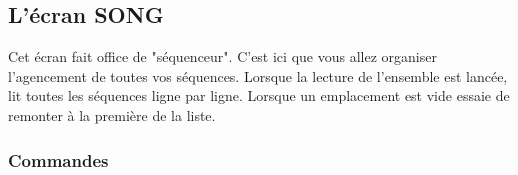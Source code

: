 \documentclass[12pt,a4paper]{article}
\begin{document}
    \subsection{L'écran SONG}
    
    Cet écran fait office de "séquenceur". C'est ici que vous allez organiser l'agencement de toutes vos séquences. Lorsque la lecture de l'ensemble est lancée, \FAT lit toutes les séquences ligne par ligne. Lorsque un emplacement est vide \FAT essaie de remonter à la première de la liste.
    
    
        \subsubsection{Commandes}
        
\end{document}
